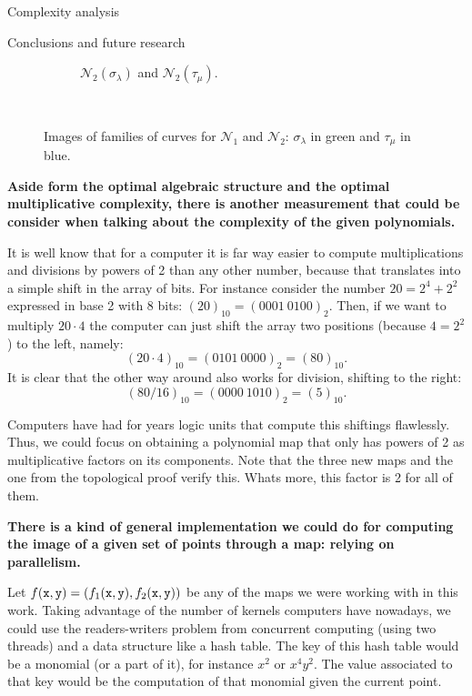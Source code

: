 \documentclass[11pt, a4paper, english, twoside, notitlepage, openright]{report}
\begin{document}
\begin{chapter}{Complexity analysis}
\begin{section}{Conclusions and future research}
\begin{figure}
\begin{subfigure}{.45\linewidth}
\vspace{-0.4cm}\caption{$\mathcal{N}_2(\sigma_{\lambda})$ and $\mathcal{N}_2(\tau_{\mu})$.\label{fig:5curves1}}
\end{subfigure}\\[1ex]
\vspace{-0.2cm}

\vspace{-0.1cm}\caption{Images of families of curves for $\mathcal{N}_1$ and $\mathcal{N}_2$: $\sigma_{\lambda}$ in green and $\tau_{\mu}$ in blue.\label{fig:curvesfg}}
\end{figure}

\newpage
\vspace{1cm}
{\bf Aside form the optimal algebraic structure and the optimal multiplicative complexity, there is another measurement that could be consider when talking about the complexity of the given polynomials.\bf }

It is well know that for a computer it is far way easier to compute multiplications and divisions by powers of 2 than any other number, because that translates into a simple shift in the array of bits. For instance consider the number $20 = 2^4 + 2^2$ expressed in base 2 with 8 bits: $(20)_{10} = (0001\ 0100)_2$. Then, if we want to multiply $20\cdot 4$ the computer can just shift the array two positions (because $4=2^2$) to the left, namely:
$$(20 \cdot 4)_{10} = (0101\ 0000)_2 = (80)_{10}.$$
It is clear that the other way around also works for division, shifting to the right:
$$(80 / 16)_{10} = (0000\ 1010)_2 = (5)_{10}.$$

Computers have had for years logic units that compute this shiftings flawlessly. Thus, we could focus on obtaining a polynomial map that only has powers of 2 as multiplicative factors on its components. Note that the three new maps and the one from the topological proof verify this. Whats more, this factor is 2 for all of them.

\vspace{1cm}
{\bf There is a kind of general implementation we could do for computing the image of a given set of points through a map: relying on parallelism.\bf}

Let $f({\tt x}, {\tt y}) = (f_1({\tt x}, {\tt y}), f_2({\tt x}, {\tt y}))$ be any of the maps we were working with in this work. Taking advantage of the number of kernels computers have nowadays, we could use the readers-writers problem from concurrent computing (using two threads) and a data structure like a hash table. The key of this hash table would be a monomial (or a part of it), for instance $x^2$ or $x^4y^2$. The value associated to that key would be the computation of that monomial given the current point.


\end{section}
\end{chapter}
\end{document}
